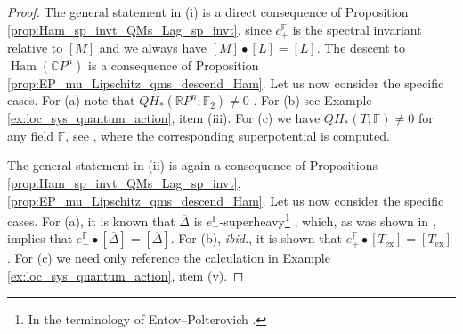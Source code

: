 \documentclass[11pt%
]{article}
\theoremstyle{definition}
\newcommand{\R}{{\mathbb{R}}}
\newcommand{\F}{{\mathbb{F}}}
\newcommand{\C}{{\mathbb{C}}}
\newcommand{\ol}{\overline}
\DeclareMathOperator{\Ham}{Ham}
\DeclareMathOperator{\0}{\operatorname{\mathbf{0}}}
\begin{document}
\begin{proof}
  The general statement in (i) is a direct consequence of Proposition \ref{prop:Ham_sp_invt_QMs_Lag_sp_invt}, since $c^\F_+$ is the spectral invariant relative to $[M]$ and we always have $[M]\bullet [L] = [L]$. The descent to $\Ham(\C P^n)$ is a consequence of Proposition \ref{prop:EP_mu_Lipschitz_qms_descend_Ham}. Let us now consider the specific cases. For (a) note that $QH_*(\R P^n;\F_2) \neq 0$ \cite{biran2007quantum}. For (b) see Example \ref{ex:loc_sys_quantum_action}, item (iii). For (c) we have $QH_*(T;\F) \neq 0$ for any field $\F$, see \cite[Section 8.1]{Biran_Cornea_Lag_Top_Enumerative_Geom}, where the corresponding superpotential is computed.

  The general statement in (ii) is again a consequence of Propositions \ref{prop:Ham_sp_invt_QMs_Lag_sp_invt}, \ref{prop:EP_mu_Lipschitz_qms_descend_Ham}. Let us now consider the specific cases. For (a), it is known that $\ol\Delta$ is $e^\F_-$-superheavy\footnote{In the terminology of Entov--Polterovich \cite{Entov_Polterovich_Rigid_subsets}.} \cite{Eliashberg_Polterovich_Sympl_QS_Quadric_Surface}, which, as was shown in \cite{leclercq2018spectral}, implies that $e^\F_-\bullet [\ol\Delta] = [\ol \Delta]$. For (b), \emph{ibid.}, it is shown that $e^\F_+\bullet [T_{\mathrm{ex}}] = [T_{\mathrm{ex}}]$. For (c) we need only reference the calculation in Example \ref{ex:loc_sys_quantum_action}, item (v).
\end{proof}
\end{document}
